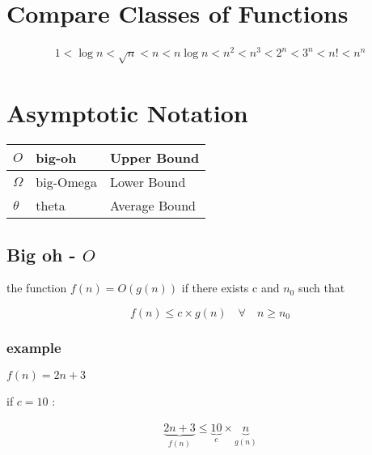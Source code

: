 \documentclass[12pt]{article}
\begin{document}
\section{Compare Classes of Functions}




\begin{align*}
1 < \log{n} < \sqrt{n} < n < n\log{n} < n^{2} < n^{3} < 2^{n} < 3^{n} < n! < n^{n}
\end{align*}






\section{Asymptotic Notation}




\begin{center}
  \bgroup
  \def\arraystretch{1.5}%
  \begin{tabular}{ l | l | l }
	$O$ 
	&
	big-oh
	&
	Upper Bound
	\\ \hline
	$\Omega$ 
	&
	big-Omega
	&
	Lower Bound
	\\ \hline
	$\theta$ 
	&
	theta
	&
	Average Bound
	\\ 
  \end{tabular}
  \egroup
\end{center}




\subsection{Big oh - $O$}

\begin{tcolorbox}
the function
$f(n) = O(g(n))$
if there exists 
c and $n_{0}$
such that 

$$
f(n) \leq c \times g(n) \quad \forall \quad n \geq n_{0}
$$
\end{tcolorbox}


\subsubsection{example}


$f(n) = 2n + 3$

if $c = 10$ :

\begin{align*}
\underbrace{2n+3}_{f(n)} \leq \underbrace{10}_{c} \times \underbrace{n}_{g(n)} 
\end{align*}
\end{document}
